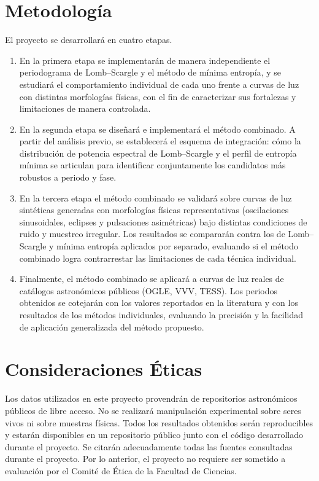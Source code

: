 \documentclass[letterpaper,12pt]{extarticle}
\begin{document}
\section{Metodología}

El proyecto se desarrollará en cuatro etapas.

\begin{enumerate}
    \item En la primera etapa se implementarán de manera independiente el periodograma de
Lomb--Scargle y el método de mínima entropía, y se estudiará el comportamiento individual
de cada uno frente a curvas de luz con distintas morfologías físicas, con el fin de
caracterizar sus fortalezas y limitaciones de manera controlada.
    \item En la segunda etapa se diseñará e implementará el método combinado. A partir del
análisis previo, se establecerá el esquema de integración: cómo la distribución de potencia
espectral de Lomb--Scargle y el perfil de entropía mínima se articulan para identificar
conjuntamente los candidatos más robustos a periodo y fase.
    \item En la tercera etapa el método combinado se validará sobre curvas de luz sintéticas
generadas con morfologías físicas representativas (oscilaciones sinusoidales, eclipses y
pulsaciones asimétricas) bajo distintas condiciones de ruido y muestreo irregular. Los
resultados se compararán contra los de Lomb--Scargle y mínima entropía aplicados por
separado, evaluando si el método combinado logra contrarrestar las limitaciones de cada
técnica individual.
    \item Finalmente, el método combinado se aplicará a curvas de luz reales de catálogos
astronómicos públicos (OGLE, VVV, TESS). Los periodos obtenidos se cotejarán con los
valores reportados en la literatura y con los resultados de los métodos individuales,
evaluando la precisión y la facilidad de aplicación generalizada del método propuesto.
\end{enumerate}

\section{Consideraciones Éticas}

Los datos utilizados en este proyecto provendrán de repositorios astronómicos públicos
de libre acceso. No se realizará manipulación experimental sobre seres vivos ni sobre
muestras físicas. Todos los resultados obtenidos serán reproducibles y estarán disponibles
en un repositorio público junto con el código desarrollado durante el proyecto. Se citarán adecuadamente todas las fuentes consultadas durante el proyecto. Por lo
anterior, el proyecto no requiere ser sometido a evaluación por el Comité de Ética
de la Facultad de Ciencias.
\end{document}

